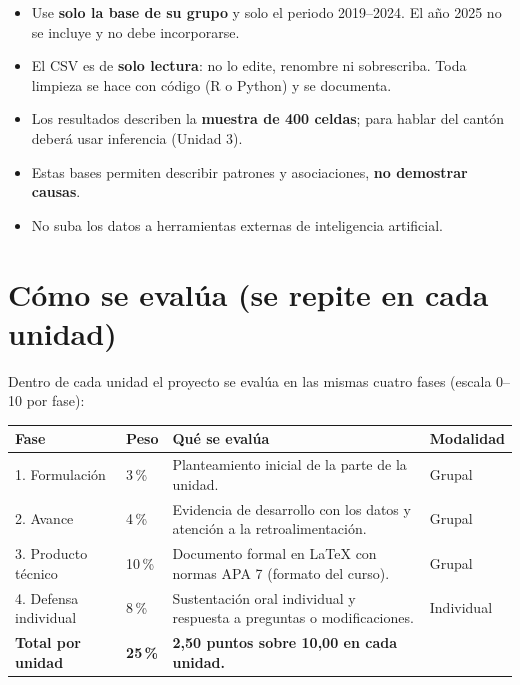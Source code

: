 \documentclass[11pt,a4paper]{article}
\begin{document}
\begin{alerta}[title=Reglas de uso de los datos]
\begin{itemize}[leftmargin=*]
  \item Use \textbf{solo la base de su grupo} y solo el periodo 2019--2024. El año 2025 no se incluye y no debe incorporarse.
  \item El CSV es de \textbf{solo lectura}: no lo edite, renombre ni sobrescriba. Toda limpieza se hace con código (R o Python) y se documenta.
  \item Los resultados describen la \textbf{muestra de 400 celdas}; para hablar del cantón deberá usar inferencia (Unidad 3).
  \item Estas bases permiten describir patrones y asociaciones, \textbf{no demostrar causas}.
  \item No suba los datos a herramientas externas de inteligencia artificial.
\end{itemize}
\end{alerta}

\section{Cómo se evalúa (se repite en cada unidad)}

Dentro de cada unidad el proyecto se evalúa en las mismas cuatro fases (escala 0--10 por fase):

\begin{center}
\small
\renewcommand{\arraystretch}{1.2}
\begin{tabularx}{\textwidth}{L{3.2cm}C{1.4cm}YC{1.8cm}}
\toprule
\textbf{Fase} & \textbf{Peso} & \textbf{Qué se evalúa} & \textbf{Modalidad} \\
. Formulación & 3\,\% & Planteamiento inicial de la parte de la unidad. & Grupal \\
2. Avance & 4\,\% & Evidencia de desarrollo con los datos y atención a la retroalimentación. & Grupal \\
3. Producto técnico & 10\,\% & Documento formal en \LaTeX{} con normas APA 7 (formato del curso). & Grupal \\
4. Defensa individual & 8\,\% & Sustentación oral individual y respuesta a preguntas o modificaciones. & Individual \\
\midrule
\textbf{Total por unidad} & \textbf{25\,\%} & \textbf{2,50 puntos sobre 10,00 en cada unidad.} & \\
\bottomrule
\end{tabularx}
\end{center}
\end{document}
